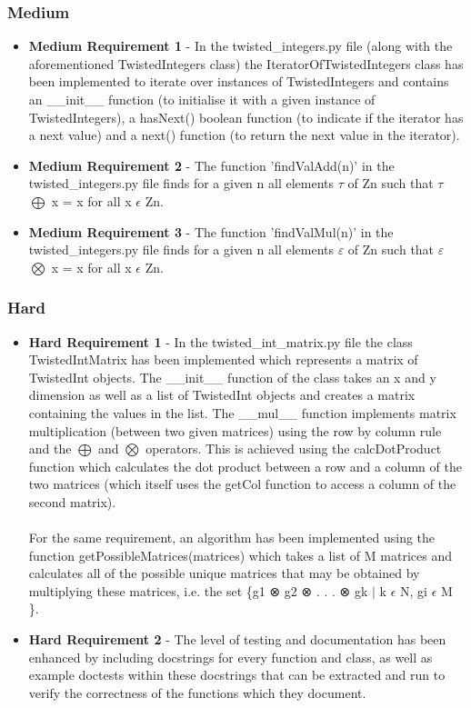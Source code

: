 \documentclass[11]{article}
\begin{document}
		\subsubsection{Medium}
			\begin{itemize}
				\item \textbf{Medium Requirement 1} - In the twisted\_integers.py file (along with the aforementioned TwistedIntegers class) the IteratorOfTwistedIntegers class has been implemented to iterate over instances of TwistedIntegers and contains an \_\_init\_\_ function (to initialise it with a given instance of TwistedIntegers), a hasNext() boolean function (to indicate if the iterator has a next value) and a next() function (to return the next value in the iterator).
				\item \textbf{Medium Requirement 2} - The function 'findValAdd(n)' in the twisted\_integers.py file finds for a given n all elements $\tau$ of Zn such that $\tau$ $\bigoplus$ x = x for all x $\epsilon$ Zn.
				\item \textbf{Medium Requirement 3} - The function 'findValMul(n)' in the twisted\_integers.py file finds for a given n all elements $\varepsilon$ of Zn such that $\varepsilon$ $\bigotimes$ x = x for all x $\epsilon$ Zn.
			\end{itemize}
		\subsubsection{Hard}
				\begin{itemize}
					\item \textbf{Hard Requirement 1} - In the twisted\_int\_matrix.py file the class TwistedIntMatrix has been implemented which represents a matrix of TwistedInt objects. The \_\_init\_\_ function of the class takes an x and y dimension as well as a list of TwistedInt objects and creates a matrix containing the values in the list. The \_\_mul\_\_ function implements matrix multiplication (between two given matrices) using the row by column rule and the $\bigoplus$ and $\bigotimes$ operators. This is achieved using the calcDotProduct function which calculates the dot product between a row and a column of the two matrices (which itself uses the getCol function to access a column of the second matrix). \\\\ For the same requirement, an algorithm has been implemented using the function getPossibleMatrices(matrices) which takes a list of M matrices and calculates all of the possible unique matrices that may be obtained by multiplying these matrices, i.e. the set  \{g1 ⊗ g2 ⊗ . . . ⊗ gk $\vert$ k $\epsilon$ N, gi $\epsilon$ M \}.
					\item \textbf{Hard Requirement 2} - The level of testing and documentation has been enhanced by including docstrings for every function and class, as well as example doctests within these docstrings that can be extracted and run to verify the correctness of the functions which they document.
				\end{itemize}
\end{document}

